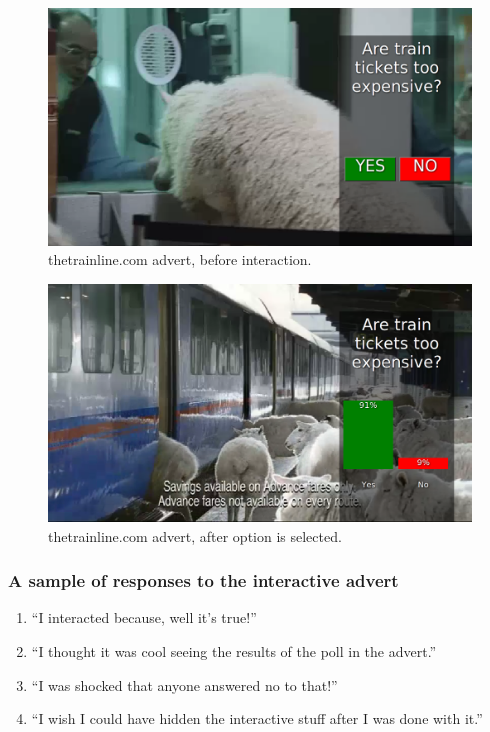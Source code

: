 	\begin{figure}[th]
		\centering
		\includegraphics[width=\textwidth,height=0.5\textheight,keepaspectratio]{images/adverts/trainline-1.png}
		\caption{thetrainline.com advert, before interaction.}
		\label{fig:trainline1}
	\end{figure}

	\begin{figure}[th]
		\centering
		\includegraphics[width=\textwidth,height=0.5\textheight,keepaspectratio]{images/adverts/trainline-2.png}
		\caption{thetrainline.com advert, after option is selected.}
		\label{fig:trainline2}
	\end{figure}
	
	\subsubsection*{A sample of responses to the interactive advert}
	\begin{enumerate}
		\item{``I interacted because, well it's true!''}
		\item{``I thought it was cool seeing the results of the poll in the advert.''}
		\item{``I was shocked that anyone answered no to that!''}
		\item{``I wish I could have hidden the interactive stuff after I was done with it.''}
	\end{enumerate}


